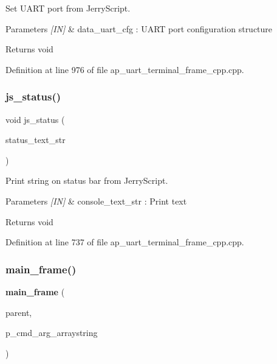 Set U\+A\+RT port from Jerry\+Script. 


\begin{DoxyParams}{Parameters}
{\em \mbox{[}\+I\+N\mbox{]}} & data\+\_\+uart\+\_\+cfg \+: U\+A\+RT port configuration structure \\
\hline
\end{DoxyParams}
\begin{DoxyReturn}{Returns}
void 
\end{DoxyReturn}


Definition at line 976 of file ap\+\_\+uart\+\_\+terminal\+\_\+frame\+\_\+cpp.\+cpp.

\mbox{\label{group___u_a_r_t__terminal_ga27bdbad8ec39cf332c440b6bd88158de}} 
\subsubsection{js\_status()}
{\footnotesize\ttfamily void js\+\_\+status (\begin{DoxyParamCaption}\item[{wx\+String}]{status\+\_\+text\+\_\+str }\end{DoxyParamCaption})}



Print string on status bar from Jerry\+Script. 


\begin{DoxyParams}{Parameters}
{\em \mbox{[}\+I\+N\mbox{]}} & console\+\_\+text\+\_\+str \+: Print text \\
\hline
\end{DoxyParams}
\begin{DoxyReturn}{Returns}
void 
\end{DoxyReturn}


Definition at line 737 of file ap\+\_\+uart\+\_\+terminal\+\_\+frame\+\_\+cpp.\+cpp.

\mbox{\label{group___u_a_r_t__terminal_gac6d177669b3810c95fed339b05281e82}} 
\subsubsection{main\_frame()}
{\footnotesize\ttfamily \textbf{ main\+\_\+frame} (\begin{DoxyParamCaption}\item[{wx\+Window $\ast$}]{parent,  }\item[{wx\+Array\+String $\ast$}]{p\+\_\+cmd\+\_\+arg\+\_\+arraystring }\end{DoxyParamCaption})}



